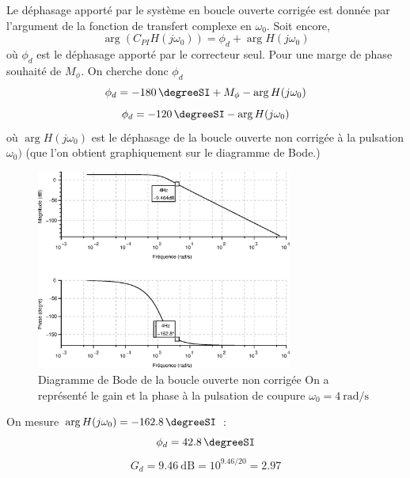 Le déphasage apporté par le système en boucle ouverte corrigée est donnée
par l'argument de la fonction de transfert complexe en  $\omega_0$. Soit
encore, 
\[
    \arg{\left(C_{PI}H(j\omega_0)\right)} = \phi_d + \arg{H(j\omega_0)}
\]
où $\phi_d$ est le déphasage apporté par le correcteur seul.
Pour une marge de phase souhaité de $M_\phi$. On cherche donc $\phi_d$
\[
    \phi_d=\SI{-180}{\degreeSI}+M_\phi-\arg{H(j\omega_0)}
\]
\[
    \phi_d=\SI{-120}{\degreeSI}-\arg{H(j\omega_0)}
\]
où $\arg{H(j\omega_0)}$ est le déphasage de la boucle ouverte non corrigée à 
la pulsation $\omega_0)$ (que l'on obtient graphiquement sur le diagramme de 
Bode.)
\begin{figure}
    \centering
    \includegraphics[width=0.75\textwidth]{fig/chap_correction/bode_BONC_2.eps}
    \caption{Diagramme de Bode de la boucle ouverte non corrigée
             On a représenté le gain et la phase à la pulsation de coupure 
             $\omega_0=\SI{4}{\radian\per\second}$}
\end{figure}
On mesure $\arg{H(j\omega_0)}=\SI{-162.8}{\degreeSI}$ :
\[
    \phi_d=\SI{42.8}{\degreeSI}
\]
\[
    G_d=\SI{9.46}{\dB}=10^{9.46/20}=2.97
\]
